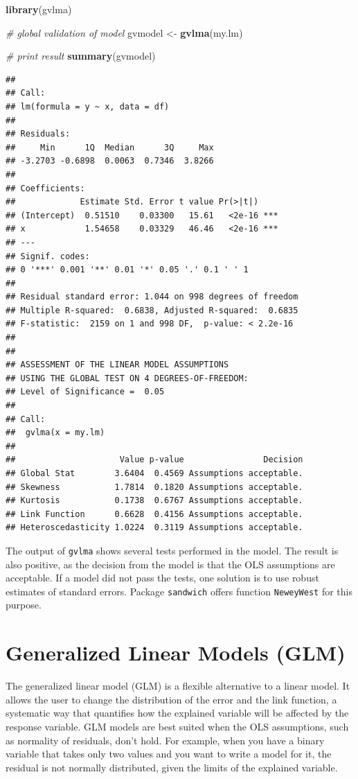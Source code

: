 \documentclass[11pt,]{book}
\newenvironment{Shaded}{\begin{snugshade}}{\end{snugshade}}
\newcommand{\KeywordTok}[1]{\textcolor[rgb]{0.27,0.27,0.27}{\textbf{#1}}}
\newcommand{\StringTok}[1]{\textcolor[rgb]{0.5,0.5,0.5}{#1}}
\newcommand{\CommentTok}[1]{\textcolor[rgb]{0.56,0.35,0.01}{\textit{#1}}}
\newcommand{\NormalTok}[1]{#1}
\begin{document}
\begin{Shaded}
\begin{Highlighting}[]
\KeywordTok{library}\NormalTok{(gvlma)}

\CommentTok{# global validation of model}
\NormalTok{gvmodel <-}\StringTok{ }\KeywordTok{gvlma}\NormalTok{(my.lm) }

\CommentTok{# print result}
\KeywordTok{summary}\NormalTok{(gvmodel)}
\end{Highlighting}
\end{Shaded}

\begin{verbatim}
## 
## Call:
## lm(formula = y ~ x, data = df)
## 
## Residuals:
##     Min      1Q  Median      3Q     Max 
## -3.2703 -0.6898  0.0063  0.7346  3.8266 
## 
## Coefficients:
##             Estimate Std. Error t value Pr(>|t|)    
## (Intercept)  0.51510    0.03300   15.61   <2e-16 ***
## x            1.54658    0.03329   46.46   <2e-16 ***
## ---
## Signif. codes:  
## 0 '***' 0.001 '**' 0.01 '*' 0.05 '.' 0.1 ' ' 1
## 
## Residual standard error: 1.044 on 998 degrees of freedom
## Multiple R-squared:  0.6838, Adjusted R-squared:  0.6835 
## F-statistic:  2159 on 1 and 998 DF,  p-value: < 2.2e-16
## 
## 
## ASSESSMENT OF THE LINEAR MODEL ASSUMPTIONS
## USING THE GLOBAL TEST ON 4 DEGREES-OF-FREEDOM:
## Level of Significance =  0.05 
## 
## Call:
##  gvlma(x = my.lm) 
## 
##                     Value p-value                Decision
## Global Stat        3.6404  0.4569 Assumptions acceptable.
## Skewness           1.7814  0.1820 Assumptions acceptable.
## Kurtosis           0.1738  0.6767 Assumptions acceptable.
## Link Function      0.6628  0.4156 Assumptions acceptable.
## Heteroscedasticity 1.0224  0.3119 Assumptions acceptable.
\end{verbatim}

The output of \texttt{gvlma} shows several tests performed in the model.
The result is also positive, as the decision from the model is that the
OLS assumptions are acceptable. If a model did not pass the tests, one
solution is to use robust estimates of standard errors. Package
\texttt{sandwich} \citep{sandwich} offers function \texttt{NeweyWest}
for this purpose.

\section{Generalized Linear Models
(GLM)}\label{generalized-linear-models-glm}

The generalized linear model (GLM) is a flexible alternative to a linear
model. It allows the user to change the distribution of the error and
the link function, a systematic way that quantifies how the explained
variable will be affected by the response variable. GLM models are best
suited when the OLS assumptions, such as normality of residuals, don't
hold. For example, when you have a binary variable that takes only two
values and you want to write a model for it, the residual is not
normally distributed, given the limits of the explained variable.
\end{document}

